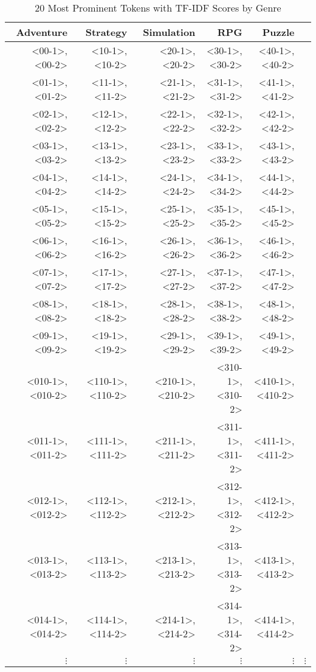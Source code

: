 \begin{table}[h]
    \centering
    \begin{tabular}{r|r|r|r|r|r}
        Adventure & Strategy & Simulation & RPG & Puzzle \\
        \hline
        <00-1>,  <00-2>  & <10-1>,  <10-2>  & <20-1>,  <20-2>  & <30-1>,  <30-2>  & <40-1>,  <40-2>  \\
        <01-1>,  <01-2>  & <11-1>,  <11-2>  & <21-1>,  <21-2>  & <31-1>,  <31-2>  & <41-1>,  <41-2>  \\
        <02-1>,  <02-2>  & <12-1>,  <12-2>  & <22-1>,  <22-2>  & <32-1>,  <32-2>  & <42-1>,  <42-2>  \\
        <03-1>,  <03-2>  & <13-1>,  <13-2>  & <23-1>,  <23-2>  & <33-1>,  <33-2>  & <43-1>,  <43-2>  \\
        <04-1>,  <04-2>  & <14-1>,  <14-2>  & <24-1>,  <24-2>  & <34-1>,  <34-2>  & <44-1>,  <44-2>  \\
        <05-1>,  <05-2>  & <15-1>,  <15-2>  & <25-1>,  <25-2>  & <35-1>,  <35-2>  & <45-1>,  <45-2>  \\
        <06-1>,  <06-2>  & <16-1>,  <16-2>  & <26-1>,  <26-2>  & <36-1>,  <36-2>  & <46-1>,  <46-2>  \\
        <07-1>,  <07-2>  & <17-1>,  <17-2>  & <27-1>,  <27-2>  & <37-1>,  <37-2>  & <47-1>,  <47-2>  \\
        <08-1>,  <08-2>  & <18-1>,  <18-2>  & <28-1>,  <28-2>  & <38-1>,  <38-2>  & <48-1>,  <48-2>  \\
        <09-1>,  <09-2>  & <19-1>,  <19-2>  & <29-1>,  <29-2>  & <39-1>,  <39-2>  & <49-1>,  <49-2>  \\
        <010-1>, <010-2> & <110-1>, <110-2> & <210-1>, <210-2> & <310-1>, <310-2> & <410-1>, <410-2> \\
        <011-1>, <011-2> & <111-1>, <111-2> & <211-1>, <211-2> & <311-1>, <311-2> & <411-1>, <411-2> \\
        <012-1>, <012-2> & <112-1>, <112-2> & <212-1>, <212-2> & <312-1>, <312-2> & <412-1>, <412-2> \\
        <013-1>, <013-2> & <113-1>, <113-2> & <213-1>, <213-2> & <313-1>, <313-2> & <413-1>, <413-2> \\
        <014-1>, <014-2> & <114-1>, <114-2> & <214-1>, <214-2> & <314-1>, <314-2> & <414-1>, <414-2> \\
        $\vdots$ & $\vdots$ & $\vdots$ & $\vdots$ & $\vdots$ & $\vdots$
    \end{tabular}
    \caption{20 Most Prominent Tokens with TF-IDF Scores by Genre}
    \label{tab:tfidf_by_genre}
\end{table}